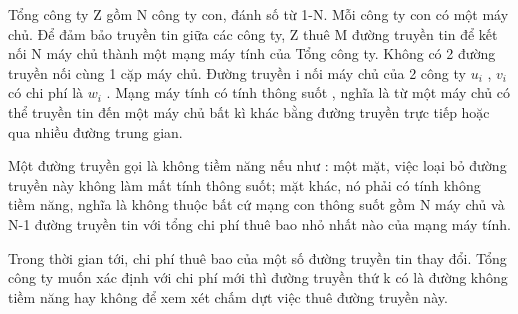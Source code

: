Tổng công ty Z gồm N công ty con, đánh số từ 1-N. Mỗi công ty con có một máy chủ. Để đảm bảo truyền tin giữa các công ty, Z thuê M đường truyền tin để kết nối N máy chủ thành một mạng máy tính của Tổng công ty. Không có 2 đường truyền nối cùng 1 cặp máy chủ. Đường truyền i nối máy chủ của 2 công ty $u_{i}$ , $v_{i}$ có chi phí là $w_{i}$ . Mạng máy tính có tính thông suốt , nghĩa là từ một máy chủ có thể truyền tin đến một máy chủ bất kì khác bằng đường truyền trực tiếp hoặc qua nhiều đường trung gian.

Một đường truyền gọi là không tiềm năng nếu như : một mặt, việc loại bỏ đường truyền này không làm mất tính thông suốt; mặt khác, nó phải có tính không tiềm năng, nghĩa là không thuộc bất cứ mạng con thông suốt gồm N máy chủ và N-1 đường truyền tin với tổng chi phí thuê bao nhỏ nhất nào của mạng máy tính.

Trong thời gian tới, chi phí thuê bao của một số đường truyền tin thay đổi. Tổng công ty muốn xác định với chi phí mới thì đường truyền thứ k có là đường không tiềm năng hay không để xem xét chấm dựt việc thuê đường truyền này.